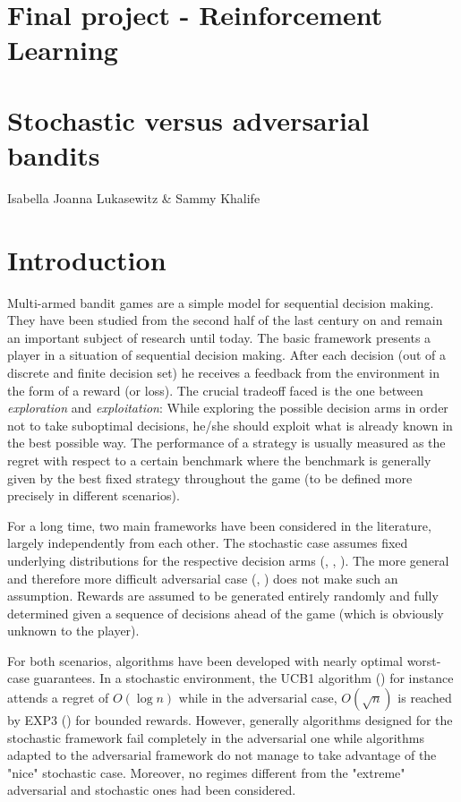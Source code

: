 \documentclass[10.5pt]{article}
\begin{document}
\parskip 6pt

\begin{center}
\section*{Final project - Reinforcement Learning}
\section*{Stochastic versus adversarial bandits}
\large{Isabella Joanna Lukasewitz \& Sammy Khalife}
\end{center}

\section*{Introduction}
Multi-armed bandit games are a simple model for sequential decision making. They have been studied from the second half of the last century on and remain an important subject of research until today. The basic framework presents a player in a situation of sequential decision making. After each decision (out of a discrete and finite decision set) he receives a feedback from the environment in the form of a reward (or loss). The crucial tradeoff faced is the one between \textit{exploration} and \textit{exploitation}: While exploring the possible decision arms in order not to take suboptimal decisions, he/she should exploit what is already known in the best possible way. The performance of a strategy is usually measured as the regret with respect to a certain benchmark where the benchmark is generally given by the best fixed strategy throughout the game (to be defined more precisely in different scenarios).

For a long time, two main frameworks have been considered in the literature, largely independently from each other. The stochastic case assumes fixed underlying distributions for the respective decision arms (\cite{Thom33}, \cite{Robb52}, \cite{Auer02a}). The more general and therefore more difficult adversarial case (\cite{Auer95},  \cite{Auer02b}) does not make such an assumption. Rewards are assumed to be generated entirely randomly and fully determined given a sequence of decisions ahead of the game (which is obviously unknown to the player).

For both scenarios, algorithms have been developed with nearly optimal worst-case guarantees. In a stochastic environment, the UCB1 algorithm (\cite{Auer02a}) for instance attends a regret of $O(\log n)$ while in the adversarial case, $O(\sqrt{n})$ is reached by EXP3 (\cite{Auer02b}) for bounded rewards. However, generally algorithms designed for the stochastic framework fail completely in the adversarial one while algorithms adapted to the adversarial framework do not manage to take advantage of the "nice" stochastic case. Moreover, no regimes different from the "extreme" adversarial and stochastic ones had been considered.
\end{document}
